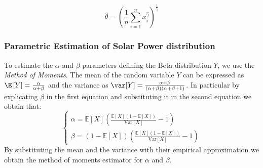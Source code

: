 \begin{equation}
\hat{\theta} = \left( \frac{1}{n} \sum_{i=1}^{n} x_i^{\hat{\gamma}} \right)^{\frac{1}{\hat{\gamma}}}
\end{equation}

\subsubsection{Parametric Estimation of Solar Power distribution}
\label{subsection: beta estim}
To estimate the \(\alpha\) and \(\beta\) parameters defining the Beta distribution \(Y\), we use the \emph{Method of Moments}.
The mean of the random variable \(Y\) can be expressed as \(\E\left[ Y\right] = \frac{\alpha}{\alpha + \beta} \) and the variance as \(\var [Y]= \frac{\alpha + \beta}{(\alpha + \beta)(\alpha + \beta + 1)}\). In particular by explicating \(\beta\) in the first equation and substituting it in the second equation we obtain that:
\begin{equation}
\begin{cases}
\alpha = \mathbb{E}[X] \left( \frac{\mathbb{E}[X](1 - \mathbb{E}[X])}{\mathrm{Var}[X]} - 1 \right) \\
\beta = (1 - \mathbb{E}[X]) \left( \frac{\mathbb{E}[X](1 - \mathbb{E}[X])}{\mathrm{Var}[X]} - 1 \right)
\end{cases}
\end{equation}
By substituting the mean and the variance with their empirical approximation we obtain the method of moments estimator for \(\alpha\) and \(\beta\).


